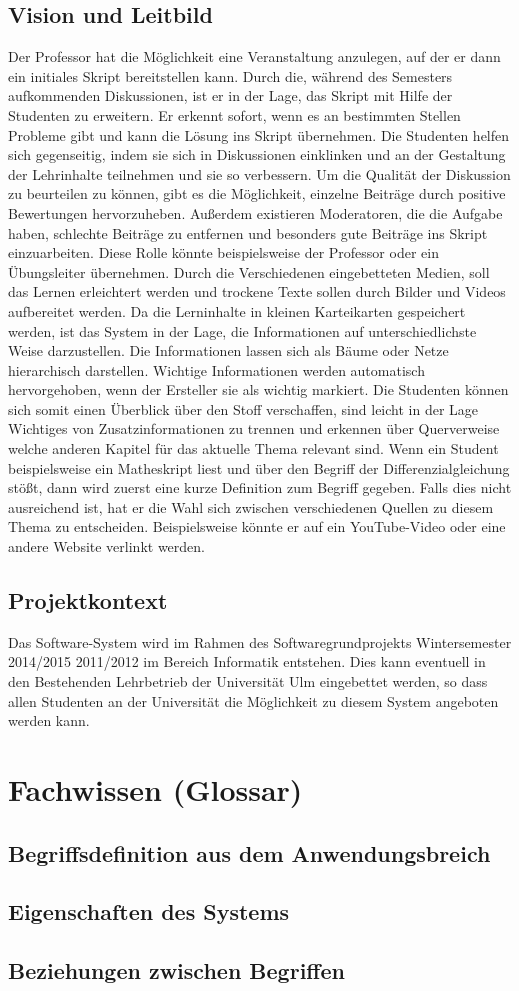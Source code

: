 \documentclass[12pt,a4paper]{book}
\begin{document}
\section{Vision und Leitbild}
Der Professor hat die Möglichkeit eine Veranstaltung anzulegen, auf der er dann ein initiales Skript bereitstellen kann. Durch die, während des Semesters aufkommenden Diskussionen, ist er in der Lage, das Skript mit Hilfe der Studenten zu erweitern. Er erkennt sofort, wenn es an bestimmten Stellen Probleme gibt und kann die Lösung ins Skript übernehmen. 
Die Studenten helfen sich gegenseitig, indem sie sich in Diskussionen einklinken und an der Gestaltung der Lehrinhalte teilnehmen und sie so verbessern. Um die Qualität der Diskussion zu beurteilen zu können, gibt es die Möglichkeit, einzelne Beiträge durch positive Bewertungen hervorzuheben. Außerdem existieren Moderatoren, die die Aufgabe haben, schlechte Beiträge zu entfernen und besonders gute Beiträge ins Skript einzuarbeiten. Diese Rolle könnte beispielsweise der Professor oder ein Übungsleiter übernehmen. Durch die Verschiedenen eingebetteten Medien, soll das Lernen erleichtert werden und trockene Texte sollen durch Bilder und Videos aufbereitet werden. Da die Lerninhalte in kleinen Karteikarten gespeichert werden, ist das System in der Lage, die Informationen auf unterschiedlichste Weise darzustellen. Die Informationen lassen sich als Bäume oder Netze hierarchisch darstellen. Wichtige Informationen werden automatisch hervorgehoben, wenn der Ersteller sie als wichtig markiert. Die Studenten können sich somit einen Überblick über den Stoff verschaffen, sind leicht in der Lage Wichtiges von Zusatzinformationen zu trennen und erkennen über Querverweise welche anderen Kapitel für das aktuelle Thema relevant sind. 
Wenn ein Student beispielsweise ein Matheskript liest und über den Begriff der Differenzialgleichung stößt, dann wird zuerst eine kurze Definition zum Begriff gegeben. Falls dies nicht ausreichend ist, hat er die Wahl sich zwischen verschiedenen Quellen zu diesem Thema zu entscheiden. Beispielsweise könnte er auf ein YouTube-Video oder eine andere Website verlinkt werden. 

\section{Projektkontext}
Das Software-System wird im Rahmen des Softwaregrundprojekts Wintersemester 2014/2015 2011/2012 im Bereich Informatik entstehen. Dies kann eventuell in den Bestehenden Lehrbetrieb der Universität Ulm eingebettet werden, so dass allen Studenten an der Universität die Möglichkeit zu diesem System angeboten werden kann.

\chapter{Fachwissen (Glossar)}
\section{Begriffsdefinition aus dem Anwendungsbreich}
\section{Eigenschaften des Systems}
\section{Beziehungen zwischen Begriffen}
\end{document}
